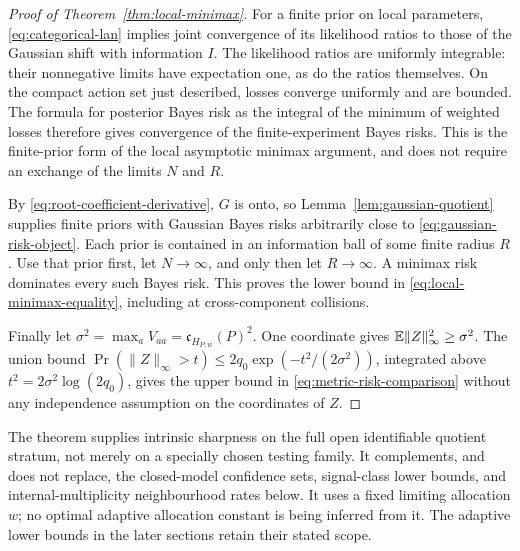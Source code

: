 \begin{proof}[Proof of Theorem~\ref{thm:local-minimax}]
For a finite prior on local parameters, \eqref{eq:categorical-lan}
implies joint convergence of its likelihood ratios to those of the
Gaussian shift with information $I$. The likelihood ratios are
uniformly integrable: their nonnegative limits have expectation one,
as do the ratios themselves. On the compact action set just described,
losses converge uniformly and are bounded. The formula for posterior
Bayes risk as the integral of the minimum of weighted losses therefore
gives convergence of the finite-experiment Bayes risks. This is the
finite-prior form of the local asymptotic minimax argument, and does
not require an exchange of the limits $N$ and $R$.

By \eqref{eq:root-coefficient-derivative}, $G$ is onto, so
Lemma~\ref{lem:gaussian-quotient} supplies finite priors with Gaussian
Bayes risks arbitrarily close to \eqref{eq:gaussian-risk-object}. Each
prior is contained in an information ball of some finite radius $R$.
Use that prior first, let $N\to\infty$, and only then let $R\to\infty$.
A minimax risk dominates every such Bayes risk. This proves the lower
bound in \eqref{eq:local-minimax-equality}, including at cross-component
collisions.

Finally let $\sigma^2=\max_aV_{aa}=\mathfrak c_{H_{P,w}}(P)^2$.
One coordinate gives $\mathbb E\|Z\|_\infty^2\ge\sigma^2$. The union bound
$\Pr(\|Z\|_\infty>t)\le2q_0\exp(-t^2/(2\sigma^2))$, integrated
above $t^2=2\sigma^2\log(2q_0)$, gives the upper bound in
\eqref{eq:metric-risk-comparison} without any independence assumption
on the coordinates of $Z$.
\end{proof}

The theorem supplies intrinsic sharpness on the full open identifiable
quotient stratum, not merely on a specially chosen testing family.
It complements, and does not replace, the closed-model confidence sets,
signal-class lower bounds, and internal-multiplicity neighbourhood rates
below. It uses a fixed limiting allocation $w$; no optimal adaptive
allocation constant is being inferred from it. The adaptive lower
bounds in the later sections retain their stated scope.
